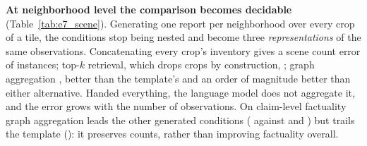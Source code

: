 \textbf{At neighborhood level the comparison becomes decidable}
(Table~\ref{tab:e7_scene}). Generating one report per neighborhood over every
crop of a tile, the conditions stop being nested and become three
\emph{representations} of the same observations. Concatenating every crop's
inventory gives a scene count error of \ESevenStructCountMAE{} instances;
top-$k$ retrieval, which drops crops by construction, \ESevenFlatCountMAE;
graph aggregation \ESevenGraphCountMAE, better than the template's
\ESevenTemplateCountMAE{} and an order of magnitude better than either
alternative. Handed everything, the language model does not aggregate it, and
the error grows with the number of observations. On claim-level factuality
graph aggregation leads the other generated conditions (\ESevenGraphFOne{}
against \ESevenStructFOne{} and \ESevenFlatFOne) but trails the template
(\ESevenTemplateFOne): it preserves counts, rather than improving factuality
overall.



